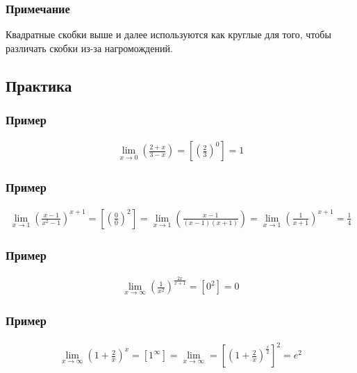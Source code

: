 \documentclass{article}
\begin{document}
\subsubsection{Примечание}
Квадратные скобки выше и далее используются как круглые для того, чтобы различать скобки из-за нагромождений.



\subsection{Практика}

\subsubsection{Пример}
\begin{gather*}
    \lim_{x \to 0} \left( \frac{2 + x}{3 - x} \right) = 
    \left[ \left( \frac{2}{3} \right)^0 \right] = 1
\end{gather*}

\subsubsection{Пример}
\begin{gather*}
    \lim_{x \to 1} \left( \frac{x - 1}{x^2 - 1} \right)^{x + 1} = 
    \left[ \left( \frac{0}{0} \right)^2 \right] =
    \lim_{x \to 1} \left( \frac{x - 1}{(x - 1)(x + 1)} \right) =
    \lim_{x \to 1} \left( \frac{1}{x + 1} \right)^{x + 1} = \frac{1}{4}
\end{gather*}

\subsubsection{Пример}
\begin{gather*}
    \lim_{x \to \infty} \left( \frac{1}{x^2} \right)^{\frac{2x}{x + 1}} =
    \left[ 0^2 \right] = 0
\end{gather*}

\subsubsection{Пример}
\begin{gather*}
    \lim_{x \to \infty} \left( 1 + \frac{2}{x} \right)^x = 
    \left[ 1^{\infty} \right] = 
    \lim_{x \to \infty} = \left[ \left( 1 + \frac{2}{x} \right)^{\frac{x}{2}} \right]^2 = e^2
\end{gather*}
\end{document}
